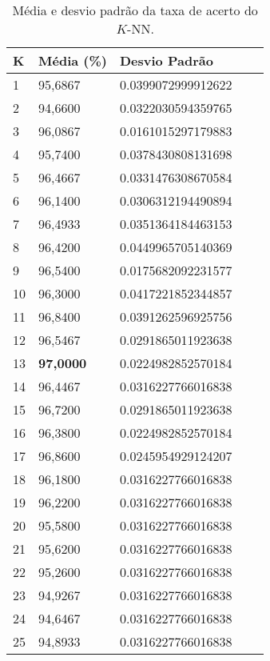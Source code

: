 \documentclass{article}
\begin{document}
\begin{table}[!h]
	\centering
	\vspace{0.5cm}
\begin{tabular}{lllll}
\hline
K  & Média (\%) & Desvio Padrão \\ \hline \hline

1  & 95,6867 & \num{0,0399072999912622} \\ \hline
2  & 94,6600 & \num{0,0322030594359765} \\ \hline
3  & 96,0867 & \num{0,0161015297179883} \\ \hline
4  & 95,7400 & \num{0,0378430808131698} \\ \hline
5  & 96,4667 & \num{0,0331476308670584} \\ \hline
6  & 96,1400 & \num{0,0306312194490894} \\ \hline
7  & 96,4933 & \num{0,0351364184463153} \\ \hline
8  & 96,4200 & \num{0,0449965705140369} \\ \hline
9  & 96,5400 & \num{0,0175682092231577} \\ \hline
10 & 96,3000 & \num{0,0417221852344857} \\ \hline
11 & 96,8400 & \num{0,0391262596925756} \\ \hline
12 & 96,5467 & \num{0,0291865011923638} \\ \hline
13 & \textbf{97,0000} & \num{0,0224982852570184} \\ \hline
14 & 96,4467 & \num{0,0316227766016838} \\ \hline
15 & 96,7200 & \num{0,0291865011923638} \\ \hline
16 & 96,3800 & \num{0,0224982852570184} \\ \hline
17 & 96,8600 & \num{0,0245954929124207} \\ \hline
18 & 96,1800 & \num{0,0316227766016838} \\ \hline
19 & 96,2200 & \num{0,0316227766016838} \\ \hline
20 & 95,5800 & \num{0,0316227766016838} \\ \hline
21 & 95,6200 & \num{0,0316227766016838} \\ \hline
22 & 95,2600 & \num{0,0316227766016838} \\ \hline
23 & 94,9267 & \num{0,0316227766016838} \\ \hline
24 & 94,6467 & \num{0,0316227766016838} \\ \hline
25 & 94,8933 & \num{0,0316227766016838} \\ \hline

\end{tabular}
\caption{Média e desvio padrão da taxa de acerto do $K$-NN.}\label{tab:knn}
\end{table}
\end{document}
